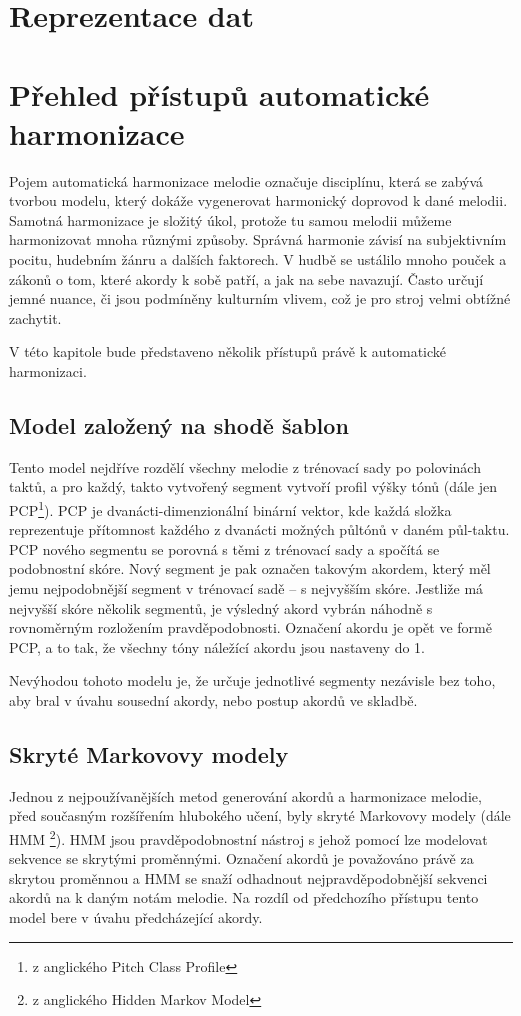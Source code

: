 \chapter{Reprezentace dat}

\chapter{Přehled přístupů automatické harmonizace}
Pojem automatická harmonizace melodie označuje disciplínu, která se zabývá tvorbou modelu, 
který dokáže vygenerovat harmonický doprovod k dané melodii.
Samotná harmonizace je složitý úkol, protože tu samou melodii můžeme harmonizovat mnoha různými způsoby.
Správná harmonie závisí na subjektivním pocitu, hudebním žánru a dalších faktorech.
V hudbě se ustálilo mnoho pouček a zákonů o tom, které akordy k sobě patří,
a jak na sebe navazují.
Často určují jemné nuance, či jsou podmíněny kulturním vlivem, 
což je pro stroj velmi obtížné zachytit.\cite{YinCheng_comparativeStudy}
\par
V této kapitole bude představeno několik přístupů právě k automatické harmonizaci.

\section{Model založený na shodě šablon}
\label{shodaSablon}
Tento model nejdříve rozdělí všechny melodie z trénovací sady po polovinách taktů, 
a pro každý, takto vytvořený segment vytvoří profil výšky tónů 
(dále jen PCP\footnote{z anglického Pitch Class Profile}).\cite{YinCheng_comparativeStudy}
PCP je dvanácti-dimenzionální binární vektor, 
kde každá složka reprezentuje přítomnost každého z dvanácti možných půltónů v daném půl-taktu.\cite{fujishima}
PCP nového segmentu se porovná s těmi z trénovací sady
a spočítá se podobnostní skóre.
Nový segment je pak označen takovým akordem,
který měl jemu nejpodobnější segment v trénovací sadě -- s nejvyšším skóre.
Jestliže má nejvyšší skóre několik segmentů,
je výsledný akord vybrán náhodně s rovnoměrným rozložením pravděpodobnosti.
Označení akordu je opět ve formě PCP, a to tak,
že všechny tóny náležící akordu jsou nastaveny do 1.
\par
Nevýhodou tohoto modelu je, že určuje jednotlivé segmenty nezávisle bez toho,
aby bral v úvahu sousední akordy, nebo postup akordů ve skladbě.\cite{YinCheng_comparativeStudy}

\section{Skryté Markovovy modely}
Jednou z nejpoužívanějších metod generování akordů a harmonizace melodie, 
před současným rozšířením hlubokého učení, byly skryté Markovovy modely (dále HMM \footnote{z anglického Hidden Markov Model}).
HMM jsou pravděpodobnostní nástroj s jehož pomocí lze modelovat sekvence se skrytými proměnnými.
Označení akordů je považováno právě za skrytou proměnnou a 
HMM se snaží odhadnout nejpravděpodobnější sekvenci akordů na k daným notám melodie.
Na rozdíl od předchozího přístupu tento model bere v úvahu předcházející akordy.\cite{YinCheng_comparativeStudy}

